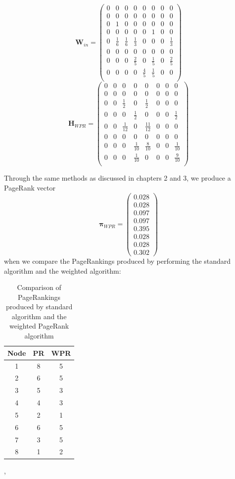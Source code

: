 \documentclass[11pt]{report}
\begin{document}
\[\textbf{W}_{in}=\left(
\begin{array}{cccccccc}
0 & 0 & 0 & 0 & 0 & 0 & 0 & 0 \\
0 & 0 & 0 & 0 & 0 & 0 & 0 & 0\\
0 & 1 & 0 & 0 & 0 & 0 & 0 & 0\\
0 & 0 & 0 & 0 & 0 & 1 & 0 & 0\\
0 & \frac{1}{6} & \frac{1}{6} & \frac{1}{3} & 0 & 0 & 0 & \frac{1}{3}\\
0 & 0 & 0 & 0 & 0 & 0 & 0 & 0 \\
0 & 0 & 0 & \frac{2}{5} & 0 & \frac{1}{5} & 0 & \frac{2}{5}\\
0 & 0 & 0 & 0 & \frac{4}{5} & \frac{1}{5} & 0 & 0\\
\end{array}
\right)	\]
\[\textbf{H}_{WPR}=\left(
\begin{array}{cccccccc}
0 & 0 & 0 & 0 & 0 & 0 & 0 & 0 \\
0 & 0 & 0 & 0 & 0 & 0 & 0 & 0\\
0 & 0 & \frac{1}{2} & 0 & \frac{1}{2} & 0 & 0 & 0\\
0 & 0 & 0 & \frac{1}{2} & 0 & 0 & 0 & \frac{1}{2}\\
0 & 0 & \frac{1}{12} & 0 & \frac{11}{12} & 0 & 0 & 0\\
0 & 0 & 0 & 0 & 0 & 0 & 0 & 0 \\
0 & 0 & 0 & \frac{1}{10} & \frac{8}{10} & 0 & 0 & \frac{1}{10}\\
0 & 0 & 0 & \frac{1}{10} & 0 & 0 & 0 & \frac{9}{10}\\
\end{array}
\right)	\]

Through the same methods as discussed in chapters 2 and 3, we produce a PageRank vector 
\[\boldsymbol\pi_{WPR} = \left(
\begin{array}{c}
0.028 \\
0.028 \\
0.097 \\
0.097 \\
0.395 \\
0.028 \\
0.028 \\
0.302
\end{array}
\right)\]
when we compare the PageRankings produced by performing the standard algorithm and the weighted algorithm:
\begin{table}[H] \caption{Comparison of PageRankings produced by standard algorithm and the weighted PageRank algorithm}
 \centering
 \begin{tabular} {c| c c} 
 Node & PR & WPR \\ [0.5ex] 
 \hline
 1&8&5\\
 2&6&5\\
 3&5&3\\
 4&4&3\\
 5&2&1\\
 6&6&5\\
 7&3&5\\
 8&1&2\\
 \end{tabular}
 \label{Table:WPR and PR}
\end{table}
\cite{langville}, \cite{baeza2004web}
\end{document}
